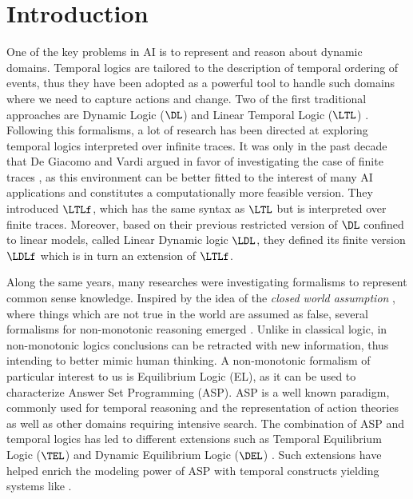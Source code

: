 \section{Introduction   }
\label{sec:introduction}

One of the key problems in AI is to represent and reason about dynamic domains. 
Temporal logics are tailored to the description of temporal ordering of events, thus they have been adopted as a powerful tool to handle such domains where we need to capture actions and change. 
Two of the first traditional approaches are Dynamic Logic ($\DL$) \cite{pratt76a} and Linear Temporal Logic ($\LTL$) \cite{pnueli77a}. 
Following this formalisms, a lot of research has been directed at exploring temporal logics interpreted over infinite traces.
It was only in the past decade that De Giacomo and Vardi argued in favor of investigating the case of finite traces \cite{giavar13a}, as this environment can be better fitted to the interest of many AI applications and constitutes a computationally more feasible version.
They introduced $\LTLf$, which has the same syntax as $\LTL$ but is interpreted over finite traces. 
Moreover, based on their previous restricted version of $\DL$ confined to linear models, called Linear Dynamic logic $\LDL$, they defined its finite version $\LDLf$ which is in turn an extension of $\LTLf$.

Along the same years, many researches were investigating formalisms to represent common sense knowledge. 
Inspired by the idea of the \emph{closed world assumption} \cite{reiter77a}, where things which are not true in the world are assumed as false, several formalisms for non-monotonic reasoning emerged \cite{gellif88b,moore84a,mcddoy80,pearce06a}. 
Unlike in classical logic, in non-monotonic logics conclusions can be retracted with new information, thus intending to better mimic human thinking. 
A non-monotonic formalism of particular interest to us is Equilibrium Logic (EL)\cite{pearce06a}, as it can be used to characterize Answer Set Programming (ASP)\cite{breitr11a}. ASP is a well known paradigm, commonly used for temporal reasoning and the representation of action theories as well as other domains requiring intensive search. The combination of ASP and temporal logics has led to different extensions such as 
Temporal Equilibrium Logic ($\TEL$) \cite{agcadipevi13a} and Dynamic Equilibrium Logic ($\DEL$) \cite{cadisc19a}. Such extensions have helped enrich the modeling power of ASP with temporal constructs yielding systems like \telingo \cite{cakamosc19a}.


